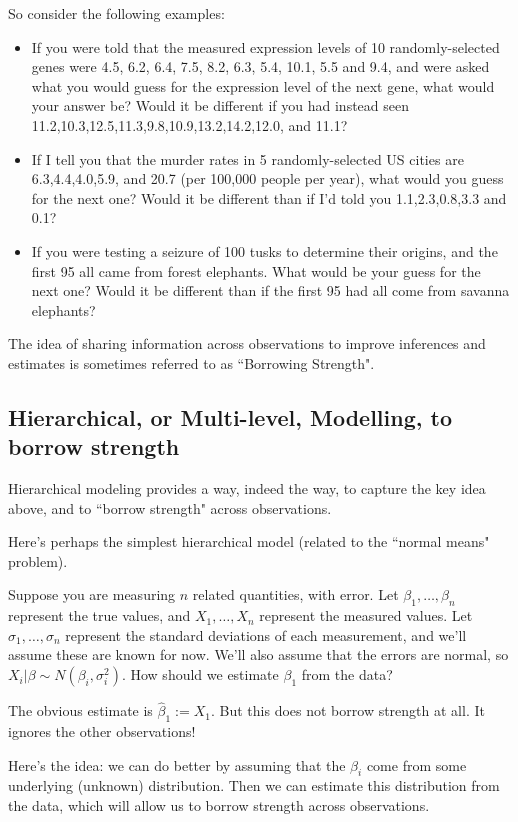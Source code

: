 \documentclass{article}
\begin{document}
So consider the following examples:
\begin{itemize}
\item If you were told that the measured expression levels of 10 randomly-selected genes were 4.5, 6.2, 6.4, 7.5, 8.2, 6.3, 5.4, 10.1, 5.5 and 9.4, and were asked what you would guess for the expression level of the next gene,
what would your answer be? Would it be different if you had instead
seen 11.2,10.3,12.5,11.3,9.8,10.9,13.2,14.2,12.0, and 11.1?
\item If I tell you that the murder rates in 5 randomly-selected
US cities are 6.3,4.4,4.0,5.9, and 20.7 (per 100,000 people per year), what would you guess for the next one? Would it be different than if I'd told you 1.1,2.3,0.8,3.3 and 0.1?
\item If you were testing a seizure of 100 tusks to determine their origins,
and the first 95 all came from forest elephants. What would be your guess
for the next one? Would it be different than if the first 95 had all come from savanna elephants?
\end{itemize}
 The idea of sharing information across observations to improve inferences
 and estimates is sometimes referred to as ``Borrowing Strength".
 
 
\subsection{Hierarchical, or Multi-level, Modelling, to borrow strength}

Hierarchical modeling provides a way, indeed the way, to capture the key idea
above, and to ``borrow strength" across observations.  

Here's perhaps the simplest hierarchical model (related to the ``normal means" problem).

Suppose you are measuring $n$ related quantities, with error. Let $\beta_1,\dots,\beta_n$ represent the true values, and $X_1,\dots,X_n$ represent the measured values. Let $\sigma_1,\dots, \sigma_n$ represent the
standard deviations of each measurement, and we'll assume these are known for now. We'll also assume that the errors are normal, so $X_i | \beta \sim N(\beta_i, \sigma_i^2)$. How should we estimate $\beta_1$ from the data?

The obvious estimate is $\hat\beta_1:=X_1$.
 But this does not borrow strength at all. It ignores the other observations!
 
Here's the idea: we can do better by assuming that the $\beta_i$ come from some underlying (unknown) distribution. Then we can estimate this distribution from the data, which will allow us to borrow strength across observations.
 
\end{document}
